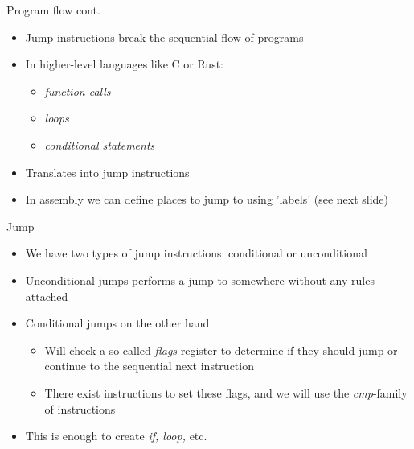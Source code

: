 \documentclass[
	11pt, %
	aspectratio=169, %
]{beamer}
\begin{document}
\begin{frame}{Program flow cont.}{\sectiontitle}
    \begin{itemize}
        \item Jump instructions break the sequential flow of programs
        \item In higher-level languages like C or Rust:
              \begin{itemize}
                  \item \textit{function calls}
                  \item \textit{loops}
                  \item \textit{conditional statements}
              \end{itemize}
        \item Translates into jump instructions
        \item In assembly we can define places to jump to using 'labels' (see next slide)
    \end{itemize}

\end{frame}

\begin{frame}{Jump}{\sectiontitle}
    \begin{itemize}
        \item We have two types of jump instructions: conditional or unconditional
        \item Unconditional jumps performs a jump to somewhere without any rules attached
        \item Conditional jumps on the other hand
              \begin{itemize}
                  \item Will check a so called \textit{flags}-register to determine if they should jump or continue to the sequential next instruction
                  \item There exist instructions to set these flags, and we will use the \textit{cmp}-family of instructions
              \end{itemize}
        \item This is enough to create \textit{if, loop,} etc.
    \end{itemize}

\end{frame}
\end{document}
